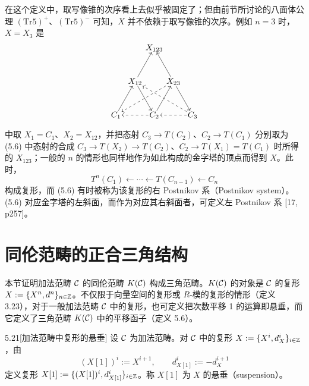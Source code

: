 
在这个定义中，取写像锥的次序看上去似乎被固定了；但由前节所讨论的八面体公理 $(\mathrm{Tr}5)^+$、$(\mathrm{Tr}5)^-$ 可知，$X$ 并不依赖于取写像锥的次序。例如 $n=3$ 时，$X=X_3$ 是
\[
\begin{tikzpicture}[scale=0.95, every node/.style={inner sep=1pt}]
\node (X123) at (1.70,3.00) {$X_{123}$};
\node (X12) at (0.85,1.50) {$X_{12}$};
\node (X23) at (2.55,1.50) {$X_{23}$};
\node (C1) at (0,0) {$C_1$};
\node (C2) at (1.70,0) {$C_2$};
\node (C3) at (3.40,0) {$C_3$};
\draw[->] (X12) -- (X123);
\draw[->] (X23) -- (X123);
\draw[->] (C1) -- (X12);
\draw[->] (X12) -- (C2);
\draw[->] (C2) -- (X23);
\draw[->] (X23) -- (C3);
\draw[->,dashed] (C3) -- (X12);
\draw[->,dashed] (X23) -- (C1);
\draw[->,dashed] (C2) -- (C1);
\draw[->,dashed] (C3) -- (C2);
\end{tikzpicture}
\]
中取 $X_1=C_1$、$X_2=X_{12}$，并把态射 $C_3\to T(C_2)$、$C_2\to T(C_1)$ 分别取为 (5.6) 中态射的合成 $C_3\to T(X_2)\to T(C_2)$、$C_2\to T(X_1)=T(C_1)$ 时所得的 $X_{123}$；一般的 $n$ 的情形也同样地作为如此构成的金字塔的顶点而得到 $X$。此时，
\[
T^n(C_1)\longleftarrow\cdots\longleftarrow T(C_{n-1})\longleftarrow C_n
\]
构成复形，而 (5.6) 有时被称为该复形的右 Postnikov 系（Postnikov system）。(5.6) 对应金字塔的左斜面，而作为对应其右斜面者，可定义左 Postnikov 系 [17, p257]。

\section{同伦范畴的正合三角结构}

本节证明加法范畴 $\mathcal{C}$ 的同伦范畴 $K(\mathcal{C})$ 构成三角范畴。$K(\mathcal{C})$ 的对象是 $\mathcal{C}$ 的复形 $X := \{X^n,d^n\}_{n\in\mathbb{Z}}$。不仅限于向量空间的复形或 $R$-模的复形的情形（定义 3.23），对于一般加法范畴 $\mathcal{C}$ 中的复形，也可定义把次数平移 1 的运算即悬垂，而它定义了三角范畴 $K(\mathcal{C})$ 中的平移函子（定义 5.6）。

\begin{definition}{5.21}[加法范畴中复形的悬垂]
设 $\mathcal{C}$ 为加法范畴。对 $\mathcal{C}$ 中的复形 $X := \{X^i,d^i_X\}_{i\in\mathbb{Z}}$，由
\[
(X[1])^i := X^{i+1},\qquad d^i_{X[1]} := -d^{i+1}_X
\]
定义复形 $X[1] := \{(X[1])^i,d^i_{X[1]}\}_{i\in\mathbb{Z}}$。称 $X[1]$ 为 $X$ 的悬垂（suspension）。
\end{definition}

